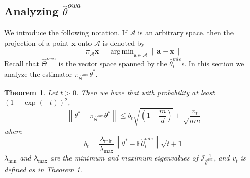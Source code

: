 \documentclass[twoside]{article}
\newtheorem{theorem}{Theorem}
\DeclareMathOperator*{\argmin}{arg\,min}
\newcommand{\W}{{\hat \Theta^{\textit{owa}}}}
\newcommand{\Wave}{{\mathcal{\hat W}^{ave}}}
\newcommand{\A}{\mathcal{A}}
\newcommand{\E}{\mathbb{E}}
\newcommand{\x}{\mathbf{x}}
\newcommand{\w}{\theta}
\newcommand{\wreopt}{\hat\w^{owa}}
\newcommand{\wave}{\hat\w^{ave}}
\newcommand{\wmle}{\hat\w^{mle}}
\newcommand{\wstar}{{\w^{*}}}
\newcommand{\tbias}{t_{\text{\textit{bias}}}}
\newcommand{\I}{\mathcal I}
\newcommand{\ltwo}[1]{{\left\lVert {#1} \right\rVert}}
\newcommand{\lzero}[1]{{\lVert {#1} \rVert}_0}
\newcommand{\proj}[1]{\pi_{{#1}}}
\begin{document}

\subsection{Analyzing $\wreopt$}
\label{sec:analreopt}

%

We introduce the following notation.
If $\A$ is an arbitrary space,
then the projection of a point $\x$ onto $\A$ is denoted by
\begin{equation}
\proj{\A}\x = \argmin_{\mathbf{a}\in\A} \ltwo{\mathbf{a}-\x}
\end{equation}
Recall that $\W$ is the vector space spanned by the $\wmle_i$s.
In this section we analyze the estimator $\proj{\W}\wstar$.

\begin{theorem}
\label{thm:wave}
Let $t>0$.
Then we have that with probability at least $(1-\exp(-t))^2$,
\begin{equation}
\ltwo{\wstar-\proj\W\wstar}
\le
b_t\sqrt{\left(1-\frac{m}{d}\right)}
+
\sqrt\frac{v_{t}}{nm}
\end{equation}
where
\begin{equation}
b_t = \frac{\lambda_{\min}}{\lambda_{\max}}\ltwo{\wstar-\E\wmle_i}\sqrt{t + 1}
\end{equation}
$\lambda_{\min}$ and $\lambda_{\max}$ are the minimum and maximum eigenvalues of $\I^{-1}_{\wave}$,
and $v_t$ is defined as in Theorem \ref{thm:wave}.
\end{theorem}
\end{document}
